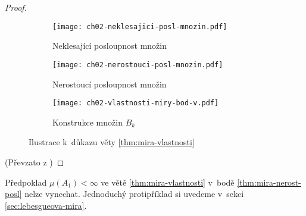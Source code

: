 \begin{proof}
\begin{figure}[h]
\begin{subfigure}{0.45\textwidth}
            \texttt{[image: ch02-neklesajici-posl-mnozin.pdf]}
            \caption{Neklesající posloupnost množin}
            \label{fig:nekl-posl-mnozin}
        \end{subfigure}
        \qquad
        \begin{subfigure}{0.45\textwidth}
            \texttt{[image: ch02-nerostouci-posl-mnozin.pdf]}
            \caption{Nerostoucí posloupnost množin}
            \label{fig:nerost-posl-mnozin}
        \end{subfigure}
        \begin{subfigure}{0.45\textwidth}
            \texttt{[image: ch02-vlastnosti-miry-bod-v.pdf]}
            \caption{Konstrukce množin $B_k$}
            \label{fig:vlastnosti-miry-bod-v}
        \end{subfigure}
        \caption{Ilustrace k~důkazu věty \ref{thm:mira-vlastnosti}}
    \end{figure}
    (Převzato z \citep[str. 19]{Netuka2016})
\end{proof}
\begin{remark}
    Předpoklad $\mu(A_1)<\infty$ ve větě \ref{thm:mira-vlastnosti} v~bodě \ref{thm:mira-nerost-posl} nelze vynechat. Jednoduchý protipříklad si uvedeme v~sekci \ref{sec:lebesgueova-mira}.
\end{remark}
